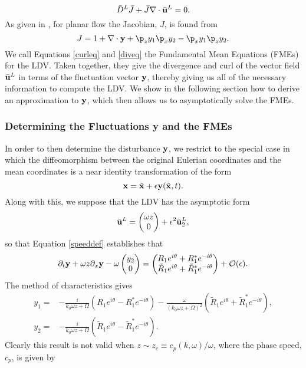 \documentclass{JFM_Style/jfm}
\newcommand{\bp}{\begin{pmatrix}}
\newcommand{\ep}{\end{pmatrix}}
\newcommand{\pd}{\partial}
\begin{document}
\begin{equation}
\bar{D}^{L}\bar{J} + \bar{J}\nabla\cdot \bar{{\bf u}}^{L} = 0.
\label{diveq}
\end{equation}
As given in \cite{buhler}, for planar flow the Jacobian, $J$, is found from
\[
J = 1 + \nabla \cdot {\bf y} + \p_{z}y_{1}\p_{x}y_{2} - \p_{x}y_{1}\p_{z}y_{2}.
\]
We call Equations \eqref{curleq} and \eqref{diveq} the Fundamental Mean Equations (FMEs) for the LDV.  Taken together, they give the divergence and curl of the vector field $\bar{{\bf u}}^{L}$ in terms of the fluctuation vector ${\bf y}$, thereby giving us all of the necessary information to compute the LDV.  We show in the following section how to derive an approximation to ${\bf y}$, which then allows us to asymptotically solve the FMEs.

\subsubsection*{Determining the Fluctuations {\bf y} and the FMEs}
In order to then determine the disturbance ${\bf y}$, we restrict to the special case in which the diffeomorphism between the original Eulerian coordinates and the mean coordinates is a near identity transformation of the form
\[
{\bf x} = \tilde{{\bf x}} + \epsilon{\bf y}(\tilde{{\bf x}},t).
\]
Along with this, we suppose that the LDV has the asymptotic form
\[
\bar{{\bf u}}^{L} = \bp \omega z \\ 0 \ep + \epsilon^{2}\bar{{\bf u}}^{L}_{2},
\]
so that Equation \eqref{speeddef} establishes that
\begin{equation}
\pd_{t}{\bf y} + \omega z \pd_{x}{\bf y} - \omega \bp y_{2}\\ 0 \ep = \bp R_{1}e^{i\theta}+R^{\ast}_{1}e^{-i\theta}\\ \tilde{R}_{1}e^{i\theta}+\tilde{R}^{\ast}_{1}e^{-i\theta} \ep + \mathcal{O}(\epsilon).
\label{vareqn}
\end{equation}
The method of characteristics gives
\begin{align}
y_{1} = & - \frac{i}{k_{0}\omega z + \Omega}\left(R_{1}e^{i\theta} -R^{\ast}_{1}e^{-i\theta} \right) - \frac{\omega}{(k_{0}\omega z + \Omega)^{2}}\left(\tilde{R}_{1}e^{i\theta} + \tilde{R}^{\ast}_{1}e^{-i\theta} \right),\label{meanfc1}\\
y_{2} = & - \frac{i}{k_{0}\omega z + \Omega}\left(\tilde{R}_{1}e^{i\theta} -\tilde{R}^{\ast}_{1}e^{-i\theta} \right) \label{meanfc2}.
\end{align}
Clearly this result is not valid when $z\sim z_{c} \equiv c_{p}(k,\omega)/\omega$, where the phase speed, $c_{p}$, is given by
\end{document}
